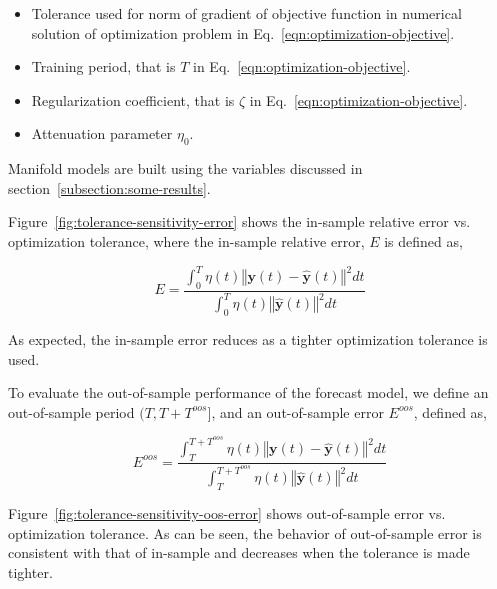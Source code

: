 \documentclass{article}
\begin{document}
\begin{itemize}

    \item Tolerance used for norm of gradient of objective function in
      numerical solution of optimization problem in
      Eq.~\ref{eqn:optimization-objective}.
  
    \item Training period, that is $T$ in
      Eq.~\ref{eqn:optimization-objective}.
  
    \item Regularization coefficient, that is $\zeta$ in
      Eq.~\ref{eqn:optimization-objective}.

    \item Attenuation parameter $\eta_{0}$.
      
\end{itemize}

Manifold models are built using the variables discussed in
section~\ref{subsection:some-results}.

Figure~\ref{fig:tolerance-sensitivity-error} shows the in-sample
relative error vs. optimization tolerance, where the in-sample
relative error, $E$ is defined as,

\begin{equation}\label{eqn:in-sample-error}
E = \frac{\int_{0}^{T} \eta(t) \left\Vert \boldsymbol{y}(t) -
  \hat{\boldsymbol{y}}(t) \right\Vert^{2} dt}{\int_{0}^{T} \eta(t) \left\Vert
  \hat{\boldsymbol{y}}(t) \right\Vert^{2} dt}
\end{equation}

As expected, the in-sample error reduces as a tighter optimization
tolerance is used.

To evaluate the out-of-sample performance of the forecast model, we
define an out-of-sample period $(T,T+T^{oos}]$, and an out-of-sample
  error $E^{oos}$, defined as,

\begin{equation}\label{eqn:out-of-sample-error}
E^{oos} = \frac{\int_{T}^{T+T^{oos}} \eta(t) \left\Vert \boldsymbol{y}(t) -
  \hat{\boldsymbol{y}}(t) \right\Vert^{2} dt}{\int_{T}^{T+T^{oos}} \eta(t)
  \left\Vert \hat{\boldsymbol{y}}(t) \right\Vert^{2} dt}
\end{equation}

Figure~\ref{fig:tolerance-sensitivity-oos-error} shows out-of-sample
error vs. optimization tolerance. As can be seen, the behavior of
out-of-sample error is consistent with that of in-sample and decreases
when the tolerance is made tighter.
\end{document}
